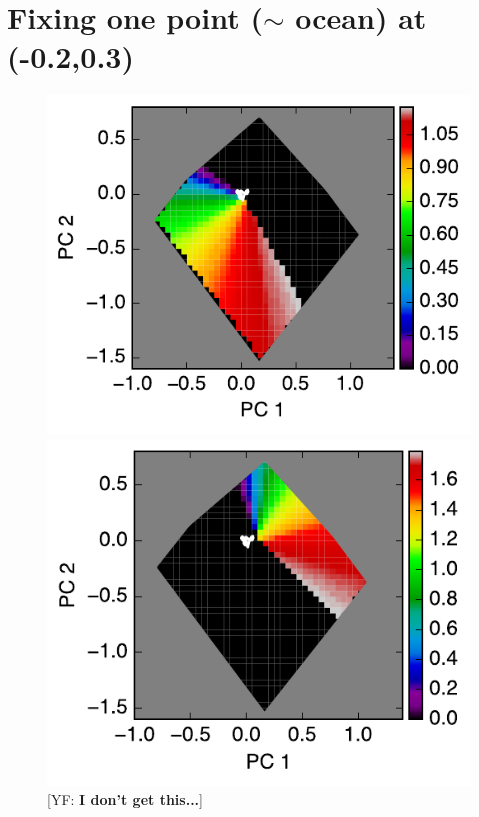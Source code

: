\documentclass[iop,numberedappendix,apj]{emulateapj}
\def\memoYF#1{\color{red}[YF: {\bf #1}]\color{black}}
\begin{document}
\newpage

\section{Fixing one point ($\sim $ ocean) at (-0.2,0.3) }



\begin{figure}[tbh!]
   \begin{minipage}{0.33\hsize}
    \begin{center}
	\includegraphics[width=\hsize]{raddata_2_norm_noreg_fixedocean_1.pdf}
    \end{center}	
   \end{minipage}
   \begin{minipage}{0.33\hsize}
    \begin{center}
	\includegraphics[width=\hsize]{raddata_2_norm_noreg_fixedocean_2.pdf}
    \end{center}	
   \end{minipage}
   \caption{\memoYF{I don't get this...}}
\end{figure}
\end{document}
